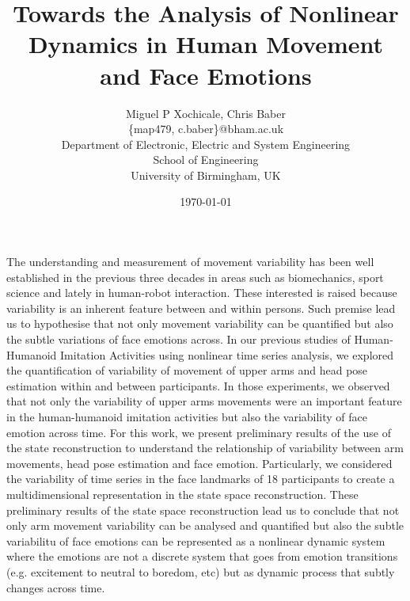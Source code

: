 \documentclass[12pt]{article}
\author{Miguel P Xochicale, Chris Baber \\
\{map479, c.baber\}@bham.ac.uk \\
Department of Electronic, Electric and System Engineering\\
School of Engineering\\
University of Birmingham, UK}
\title{Towards the Analysis of Nonlinear Dynamics in Human Movement and Face Emotions} %
\date{\today}
\begin{document}
\maketitle






The understanding and measurement of movement variability has been well established
in the previous three decades in areas such as biomechanics, sport science
and lately in human-robot interaction. These interested is raised because
variability is an inherent feature between and within persons.
Such premise lead us to hypothesise that not only movement variability
can be quantified but also the subtle variations of face emotions across.
In our previous studies of Human-Humanoid Imitation Activities using nonlinear
time series analysis, we explored the quantification of variability of movement
of upper arms and head pose estimation within and between participants.
In those experiments, we observed that not only the variability of upper arms
movements were an important feature in the human-humanoid imitation activities
but also the variability of face emotion across time.
For this work, we present preliminary results of the use of the state reconstruction
to understand the relationship of variability between arm movements, head pose
estimation and face emotion.
Particularly, we considered the variability of time series in the face landmarks
of 18 participants to create a multidimensional representation in the state space
reconstruction. These preliminary results of the state space reconstruction lead
us to conclude that not only arm movement variability
can be analysed and quantified
but also the subtle variabilitu of face emotions can be represented as a nonlinear
dynamic system where the emotions are not a discrete system that goes from emotion transitions
(e.g. excitement to neutral to boredom, etc)
but as dynamic process that subtly changes across time.
\end{document}
